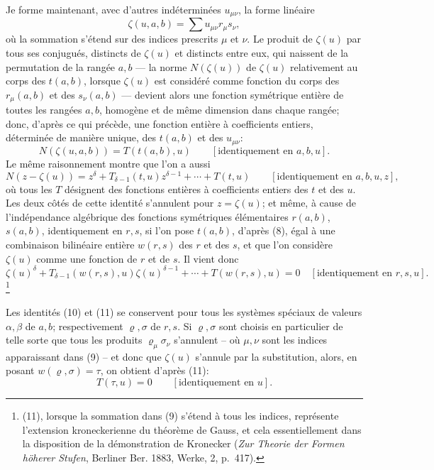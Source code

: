 \documentclass[11pt]{article}
\begin{document}
Je forme maintenant, avec d'autres indéterminées $u_{\mu\nu}$, la forme linéaire
\begin{equation}
 \zeta(u,a,b)=\sum u_{\mu\nu}r_\mu s_\nu,
\tag{9}
\end{equation}
où la sommation s'étend sur des indices prescrits $\mu$ et $\nu$. Le produit de $\zeta(u)$ par tous ses conjugués, distincts de $\zeta(u)$ et distincts entre eux, qui naissent de la permutation de la rangée $a,b$ --- la norme $N(\zeta(u))$ de $\zeta(u)$ relativement au corps des $t(a,b)$, lorsque $\zeta(u)$ est considéré comme fonction du corps des $r_\mu(a,b)$ et des $s_\nu(a,b)$ --- devient alors une fonction symétrique entière de toutes les rangées $a,b$, homogène et de même dimension dans chaque rangée; donc, d'après ce qui précède, une fonction entière à coefficients entiers, déterminée de manière unique, des $t(a,b)$ et des $u_{\mu\nu}$:
\begin{equation}
 N(\zeta(u,a,b))=T(t(a,b),u)\qquad[\text{identiquement en }a,b,u].
\tag{10}
\end{equation}
Le même raisonnement montre que l'on a aussi
\[
N(z-\zeta(u))=z^\delta+T_{\delta-1}(t,u)z^{\delta-1}+\cdots+T(t,u)
\qquad[\text{identiquement en }a,b,u,z],
\]
où tous les $T$ désignent des fonctions entières à coefficients entiers des $t$ et des $u$. Les deux côtés de cette identité s'annulent pour $z=\zeta(u)$; et même, à cause de l'indépendance algébrique des fonctions symétriques élémentaires $r(a,b)$, $s(a,b)$, identiquement en $r,s$, si l'on pose $t(a,b)$, d'après (8), égal à une combinaison bilinéaire entière $w(r,s)$ des $r$ et des $s$, et que l'on considère $\zeta(u)$ comme une fonction de $r$ et de $s$. Il vient donc
\begin{equation}
\zeta(u)^\delta+T_{\delta-1}(w(r,s),u)\zeta(u)^{\delta-1}+\cdots+T(w(r,s),u)=0
\quad[\text{identiquement en }r,s,u].
\tag{11}
\end{equation}\footnote{(11), lorsque la sommation dans (9) s'étend à tous les indices, représente l'extension kroneckerienne du théorème de Gauss, et cela essentiellement dans la disposition de la démonstration de Kronecker (\emph{Zur Theorie der Formen höherer Stufen}, Berliner Ber. 1883, Werke, 2, p.~417).}

Les identités (10) et (11) se conservent pour tous les systèmes spéciaux de valeurs $\alpha,\beta$ de $a,b$; respectivement $\varrho,\sigma$ de $r,s$. Si $\varrho,\sigma$ sont choisis en particulier de telle sorte que tous les produits $\varrho_\mu\sigma_\nu$ s'annulent -- où $\mu,\nu$ sont les indices apparaissant dans (9) -- et donc que $\zeta(u)$ s'annule par la substitution, alors, en posant $w(\varrho,\sigma)=\tau$, on obtient d'après (11):
\begin{equation}
 T(\tau,u)=0\qquad[\text{identiquement en }u].
\tag{12}
\end{equation}
\end{document}
